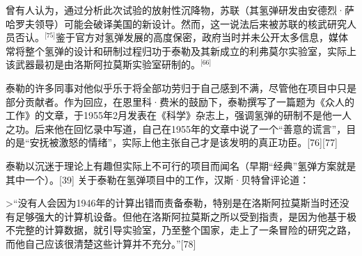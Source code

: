 曾有人认为，通过分析此次试验的放射性沉降物，苏联（其氢弹研发由安德烈·萨哈罗夫领导）可能会破译美国的新设计。然而，这一说法后来被苏联的核武研究人员否认。\(^\text{[75]}\)鉴于官方对氢弹发展的高度保密，政府当时并未公开太多信息，媒体常将整个氢弹的设计和研制过程归功于泰勒及其新成立的利弗莫尔实验室，实际上该武器最初是由洛斯阿拉莫斯实验室研制的。\(^\text{[66]}\)

泰勒的许多同事对他似乎乐于将全部功劳归于自己感到不满，尽管他在项目中只是部分贡献者。作为回应，在恩里科·费米的鼓励下，泰勒撰写了一篇题为《众人的工作》的文章，于1955年2月发表在《科学》杂志上，强调氢弹的研制不是他一人之功。后来他在回忆录中写道，自己在1955年的文章中说了一个“善意的谎言”，目的是“安抚被激怒的情绪”，实际上他主张自己才是该发明的真正功臣。[76][77]

泰勒以沉迷于理论上有趣但实际上不可行的项目而闻名（早期“经典”氢弹方案就是其中一个）。[39] 关于泰勒在氢弹项目中的工作，汉斯·贝特曾评论道：

>“没有人会因为1946年的计算出错而责备泰勒，特别是在洛斯阿拉莫斯当时还没有足够强大的计算机设备。但他在洛斯阿拉莫斯之所以受到指责，是因为他基于极不完整的计算数据，就引导实验室，乃至整个国家，走上了一条冒险的研究之路，而他自己应该很清楚这些计算并不充分。”[78]
